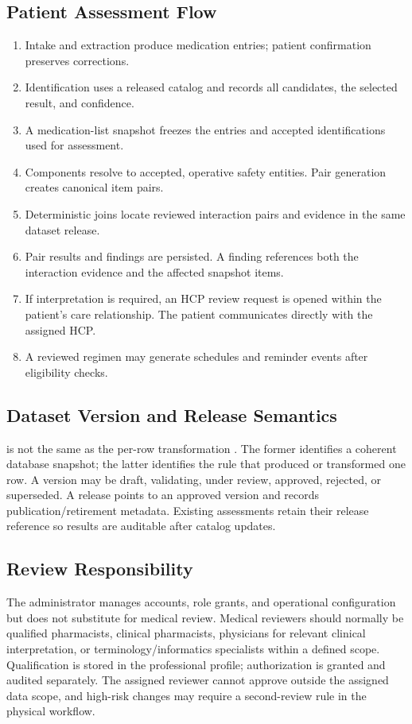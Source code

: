 \subsection{Patient Assessment Flow}

\begin{enumerate}
  \item Intake and extraction produce medication entries; patient confirmation preserves corrections.
  \item Identification uses a released catalog and records all candidates, the selected result, and confidence.
  \item A medication-list snapshot freezes the entries and accepted identifications used for assessment.
  \item Components resolve to accepted, operative safety entities. Pair generation creates canonical item pairs.
  \item Deterministic joins locate reviewed interaction pairs and evidence in the same dataset release.
  \item Pair results and findings are persisted. A finding references both the interaction evidence and the affected snapshot items.
  \item If interpretation is required, an HCP review request is opened within the patient's care relationship. The patient communicates directly with the assigned HCP.
  \item A reviewed regimen may generate schedules and reminder events after eligibility checks.
\end{enumerate}

\subsection{Dataset Version and Release Semantics}

 is not the same as the per-row transformation . The former identifies a coherent database snapshot; the latter identifies the rule that produced or transformed one row. A version may be draft, validating, under review, approved, rejected, or superseded. A release points to an approved version and records publication/retirement metadata. Existing assessments retain their release reference so results are auditable after catalog updates.

\subsection{Review Responsibility}

The administrator manages accounts, role grants, and operational configuration but does not substitute for medical review. Medical reviewers should normally be qualified pharmacists, clinical pharmacists, physicians for relevant clinical interpretation, or terminology/informatics specialists within a defined scope. Qualification is stored in the professional profile; authorization is granted and audited separately. The assigned reviewer cannot approve outside the assigned data scope, and high-risk changes may require a second-review rule in the physical workflow.

